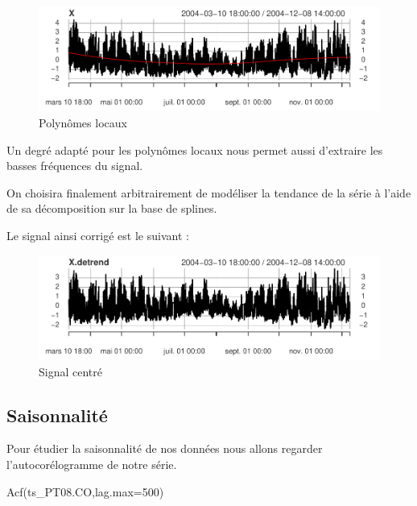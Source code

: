 \documentclass[
]{article}
\newenvironment{Shaded}{\begin{snugshade}}{\end{snugshade}}
\newcommand{\AttributeTok}[1]{\textcolor[rgb]{0.77,0.63,0.00}{#1}}
\newcommand{\DecValTok}[1]{\textcolor[rgb]{0.00,0.00,0.81}{#1}}
\newcommand{\FunctionTok}[1]{\textcolor[rgb]{0.00,0.00,0.00}{#1}}
\newcommand{\NormalTok}[1]{#1}
\begin{document}
\begin{figure}

{\centering \includegraphics{STA202_report_files/figure-latex/polynoms-1} 

}

\caption{\label{fig:polynoms} Polynômes locaux}\label{fig:polynoms}
\end{figure}

Un degré adapté pour les polynômes locaux nous permet aussi d'extraire
les basses fréquences du signal.

On choisira finalement arbitrairement de modéliser la tendance de la
série à l'aide de sa décomposition sur la base de splines.

Le signal ainsi corrigé est le suivant :

\begin{figure}

{\centering \includegraphics{STA202_report_files/figure-latex/splines.center-1} 

}

\caption{\label{fig:splines.center} Signal centré}\label{fig:splines.center}
\end{figure}

\hypertarget{saisonnalituxe9}{%
\subsection{Saisonnalité}\label{saisonnalituxe9}}

Pour étudier la saisonnalité de nos données nous allons regarder
l'autocorélogramme de notre série.

\begin{Shaded}
\begin{Highlighting}[]
\FunctionTok{Acf}\NormalTok{(ts\_PT08.CO,}\AttributeTok{lag.max=}\DecValTok{500}\NormalTok{)}
\end{Highlighting}
\end{Shaded}
\end{document}
